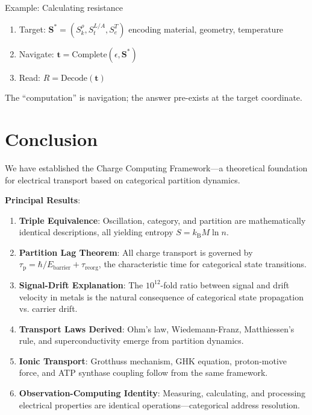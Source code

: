\documentclass[twocolumn,10pt]{article}
\theoremstyle{definition}
\theoremstyle{remark}
\newcommand{\kB}{k_{\mathrm{B}}}
\newcommand{\taup}{\tau_{\mathrm{p}}}
\newcommand{\Scoord}{\mathbf{S}}
\newcommand{\Sk}{S_k}
\newcommand{\St}{S_t}
\newcommand{\Se}{S_e}
\begin{document}
Example: Calculating resistance
\begin{enumerate}
    \item Target: $\Scoord^* = (\Sk^{\rho}, \St^{L/A}, \Se^{T})$ encoding material, geometry, temperature
    \item Navigate: $\mathbf{t} = \text{Complete}(\epsilon, \Scoord^*)$
    \item Read: $R = \text{Decode}(\mathbf{t})$
\end{enumerate}

The ``computation'' is navigation; the answer pre-exists at the target coordinate.

\section{Conclusion}
\label{sec:conclusion}

We have established the Charge Computing Framework---a theoretical foundation for electrical transport based on categorical partition dynamics.

\textbf{Principal Results}:

\begin{enumerate}
    \item \textbf{Triple Equivalence}: Oscillation, category, and partition are mathematically identical descriptions, all yielding entropy $S = \kB M \ln n$.

    \item \textbf{Partition Lag Theorem}: All charge transport is governed by $\taup = \hbar/E_{\text{barrier}} + \tau_{\text{reorg}}$, the characteristic time for categorical state transitions.

    \item \textbf{Signal-Drift Explanation}: The $10^{12}$-fold ratio between signal and drift velocity in metals is the natural consequence of categorical state propagation vs. carrier drift.

    \item \textbf{Transport Laws Derived}: Ohm's law, Wiedemann-Franz, Matthiessen's rule, and superconductivity emerge from partition dynamics.

    \item \textbf{Ionic Transport}: Grotthuss mechanism, GHK equation, proton-motive force, and ATP synthase coupling follow from the same framework.

    \item \textbf{Observation-Computing Identity}: Measuring, calculating, and processing electrical properties are identical operations---categorical address resolution.
\end{enumerate}
\end{document}

